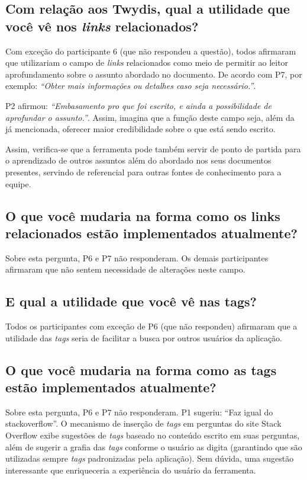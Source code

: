 \subsection{Com relação aos Twydis, qual a utilidade que você vê nos \textit{links} relacionados?}

Com exceção do participante 6 (que não respondeu a questão), todos afirmaram que utilizariam o campo de \textit{links} relacionados como meio de permitir ao leitor aprofundamento sobre o assunto abordado no documento. De acordo com P7, por exemplo: \textit{``Obter mais informações ou detalhes caso seja necessário.''}.

P2 afirmou: \textit{``Embasamento pro que foi escrito, e ainda a possibilidade de aprofundar o assunto.''}. Assim, imagina que a função deste campo seja, além da já mencionada, oferecer maior credibilidade sobre o que está sendo escrito.

Assim, verifica-se que a ferramenta pode também servir de ponto de partida para o aprendizado de outros assuntos além do abordado nos seus documentos presentes, servindo de referencial para outras fontes de conhecimento para a equipe.

\subsection{O que você mudaria na forma como os links relacionados estão implementados atualmente?}

Sobre esta pergunta, P6 e P7 não responderam. Os demais participantes afirmaram que não sentem necessidade de alterações neste campo.

\subsection{E qual a utilidade que você vê nas tags?}

Todos os participantes com exceção de P6 (que não respondeu) afirmaram que a utilidade das \textit{tags} seria de facilitar a busca por outros usuários da aplicação.

\subsection{O que você mudaria na forma como as tags estão implementados atualmente?}
\label{sec:mudaria-tags}

Sobre esta pergunta, P6 e P7 não responderam. P1 sugeriu: ``Faz igual do stackoverflow''. O mecanismo de inserção de \textit{tags} em perguntas do site Stack Overflow exibe sugestões de \textit{tags} baseado no conteúdo escrito em suas perguntas, além de sugerir a grafia das \textit{tags} conforme o usuário as digita (garantindo que são utilizadas sempre \textit{tags} padronizadas pela aplicação). Sem dúvida, uma sugestão interessante que enriqueceria a experiência do usuário da ferramenta.

